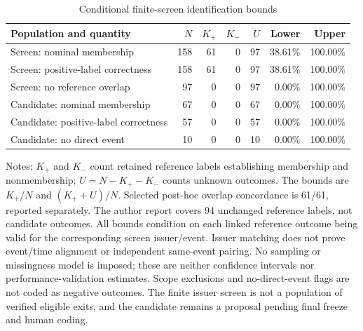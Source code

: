 \begin{table}[htbp]
\centering
\small
\caption{Conditional finite-screen identification bounds}
\label{tab:validation-identification-bounds}
\setlength{\tabcolsep}{3pt}
\begin{tabular}{@{}lrrrrrr@{}}
\toprule
Population and quantity & $N$ & $K_+$ & $K_-$ & $U$ & Lower & Upper \\
\midrule
Screen: nominal membership & 158 & 61 & 0 & 97 & 38.61\% & 100.00\% \\
Screen: positive-label correctness & 158 & 61 & 0 & 97 & 38.61\% & 100.00\% \\
Screen: no reference overlap & 97 & 0 & 0 & 97 & 0.00\% & 100.00\% \\
Candidate: nominal membership & 67 & 0 & 0 & 67 & 0.00\% & 100.00\% \\
Candidate: positive-label correctness & 57 & 0 & 0 & 57 & 0.00\% & 100.00\% \\
Candidate: no direct event & 10 & 0 & 0 & 10 & 0.00\% & 100.00\% \\
\bottomrule
\end{tabular}
\par\vspace{4pt}
\begin{minipage}{\linewidth}\footnotesize
Notes: $K_+$ and $K_-$ count retained reference labels establishing membership and nonmembership;
$U=N-K_+-K_-$ counts unknown outcomes. The bounds are $K_+/N$ and $(K_++U)/N$.
Selected post-hoc overlap concordance is 61/61, reported separately.
The author report covers 94 unchanged reference labels, not candidate outcomes.
All bounds condition on each linked reference outcome being valid for the corresponding screen issuer/event.
Issuer matching does not prove event/time alignment or independent same-event pairing.
No sampling or missingness model is imposed;
these are neither confidence intervals nor performance-validation estimates. Scope exclusions and
no-direct-event flags are not coded as negative outcomes. The finite issuer screen is not a population
of verified eligible exits, and the candidate remains a proposal pending final freeze and human coding.
\end{minipage}
\end{table}
